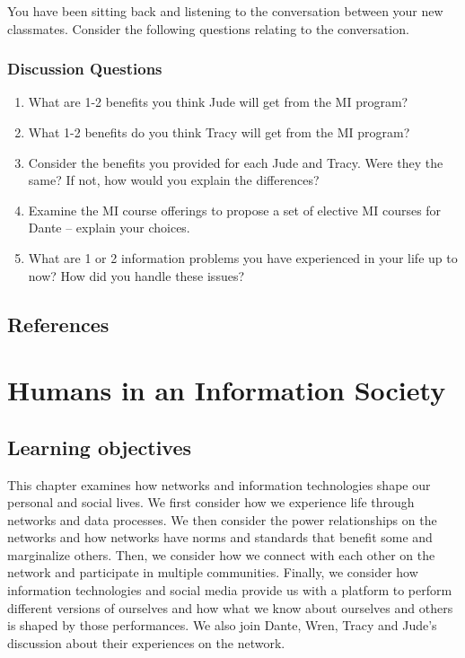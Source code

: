 \documentclass[
  letterpaper,
  DIV=11,
  numbers=noendperiod]{scrreprt}
\providecommand{\tightlist}{%
  \setlength{\itemsep}{0pt}\setlength{\parskip}{0pt}}
\begin{document}
You have been sitting back and listening to the conversation between
your new classmates. Consider the following questions relating to the
conversation.

\subsection{Discussion Questions}\label{discussion-questions}

\begin{enumerate}
\def\labelenumi{\arabic{enumi}.}
\tightlist
\item
  What are 1-2 benefits you think Jude will get from the MI program?
\item
  What 1-2 benefits do you think Tracy will get from the MI program?
\item
  Consider the benefits you provided for each Jude and Tracy. Were they
  the same? If not, how would you explain the differences?
\item
  Examine the MI course offerings to propose a set of elective MI
  courses for Dante -- explain your choices.
\item
  What are 1 or 2 information problems you have experienced in your life
  up to now? How did you handle these issues?
\end{enumerate}

\section{References}\label{references-2}


\chapter{Humans in an Information
Society}\label{humans-in-an-information-society}

\section{Learning objectives}\label{learning-objectives-3}

This chapter examines how networks and information technologies shape
our personal and social lives. We first consider how we experience life
through networks and data processes. We then consider the power
relationships on the networks and how networks have norms and standards
that benefit some and marginalize others. Then, we consider how we
connect with each other on the network and participate in multiple
communities. Finally, we consider how information technologies and
social media provide us with a platform to perform different versions of
ourselves and how what we know about ourselves and others is shaped by
those performances. We also join Dante, Wren, Tracy and Jude's
discussion about their experiences on the network.
\end{document}
